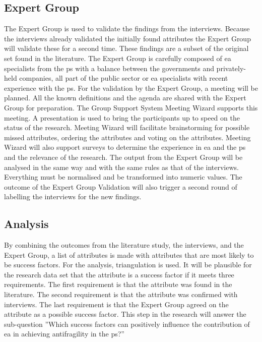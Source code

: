 \subsection{Expert Group}
\label{sub:expertgroup}
The Expert Group is used to validate the findings from the interviews. Because the interviews already validated the initially found attributes the Expert Group will validate these for a second time. These findings are a subset of the original set found in the literature. The Expert Group is carefully composed of \acrshort{ea} specialists from the \gls{ps} with a balance between the governments and privately-held companies, all part of the public sector or \acrshort{ea} specialists with recent experience with the \gls{ps}. For the validation by the Expert Group, a meeting will be planned. All the known definitions and the agenda are shared with the Expert Group for preparation. The Group Support System Meeting Wizard supports this meeting. A presentation is used to bring the participants up to speed on the status of the research. Meeting Wizard will facilitate brainstorming for possible missed attributes, ordering the attributes and voting on the attributes. Meeting Wizard will also support surveys to determine the experience in \acrshort{ea} and the \gls{ps} and the relevance of the research. The output from the Expert Group will be analysed in the same way and with the same rules as that of the interviews. Everything must be normalised and be transformed into numeric values. The outcome of the Expert Group Validation will also trigger a second round of labelling the interviews for the new findings. 

\subsection{Analysis}
\label{sub:analysis}
By combining the outcomes from the literature study, the interviews, and the Expert Group, a list of attributes is made with attributes that are most likely to be success factors. For the analysis, \gls{triangulation} is used. It will be plausible for the research data set that the attribute is a success factor if it meets three requirements. The first requirement is that the attribute was found in the literature. The second requirement is that the attribute was confirmed with interviews. The last requirement is that the Expert Group agreed on the attribute as a possible success factor. This step in the research will answer the sub-question ''Which success factors can positively influence the contribution of \acrlong{ea} in achieving \gls{antifragility} in the \gls{ps}?''


